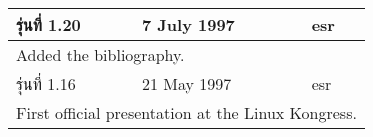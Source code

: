 {\begin{tabular*}{\textwidth}{|l|l|l|}
    รุ่นที่ 1.20 & 7 July 1997       & esr                                                                                                                                                                           \\  \hline
    \multicolumn{3}{|p{.963\textwidth}|}{Added the bibliography.}                                                                                                                                                    \\ \hline
    รุ่นที่ 1.16 & 21 May 1997       & esr                                                                                                                                                                           \\  \hline
    \multicolumn{3}{|p{.963\textwidth}|}{First official presentation at the Linux Kongress.}                                                                                                                         \\  \hline
  \end{tabular*}
}
